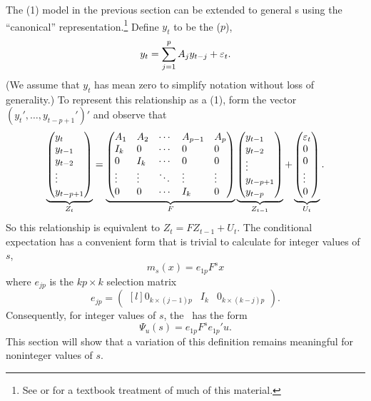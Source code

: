 \documentclass[12pt,fleqn]{article}
\begin{document}
The \AR(1) model in the previous section can be extended to general
\VAR s using the ``canonical'' representation.\footnote{%
  See \citet{Ham:94} or \citet{HaS:13} for a textbook treatment of
  much of this material.} %
Define $y_t$ to be the \VAR($p$),
\[
y_t = \sum_{j=1}^p A_j y_{t-j} + \varepsilon_t.
\]
(We assume that $y_t$ has mean zero to simplify notation without loss
of generality.) To represent this relationship as a \VAR(1), form the
vector $(y_t',\dots,y_{t-p+1}')'$ and observe that
\begin{equation}
\label{eq:6}
\underbrace{\begin{pmatrix*}[l]
  y_t \\ y_{t-1} \\ y_{t-2} \\ \vdots \\ y_{t-p+1}
\end{pmatrix*}}_{Z_t}
=
\underbrace{\begin{pmatrix*}[l]
  A_1 & A_2 & \cdots & A_{p-1} & A_p \\
  I_k & 0   & \cdots & 0 & 0 \\
  0  & I_k  & \cdots & 0 & 0 \\
  \vdots & \vdots & \ddots & \vdots & \vdots \\
  0 & 0 & \cdots & I_k & 0
\end{pmatrix*}}_{F}
\underbrace{\begin{pmatrix*}[l]
  y_{t-1} \\ y_{t-2} \\ \vdots \\ y_{t-p+1} \\ y_{t-p}
\end{pmatrix*}}_{Z_{t-1}}
+
\underbrace{\begin{pmatrix*}[l]
  \vep_{t} \\ 0 \\ 0 \\ \vdots \\ 0
\end{pmatrix*}}_{U_t}.
\end{equation}
So this relationship is equivalent to $Z_t = F Z_{t-1} + U_t$. The
conditional expectation has a convenient form that is trivial to
calculate for integer values of $s$,
\begin{equation*}
  m_s(x) = e_{1p} F^s x
\end{equation*}
where $e_{jp}$ is the $k p \times k$ selection matrix
\begin{equation*}
  e_{jp} = \begin{pmatrix*}[l]
    0_{k \times (j-1)p} & I_k & 0_{k \times (k - j)p}
  \end{pmatrix*}.
\end{equation*}
Consequently, for integer values of $s$, the \IRF\ has the form
\begin{equation*}
  \Psi_u(s) = e_{1p} F^s e_{1p}' u.
\end{equation*}
This section will show that a variation of
this definition remains meaningful for noninteger values of $s$.
\end{document}
